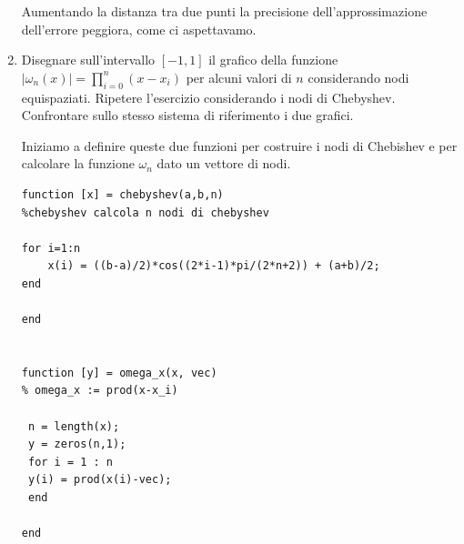 \begin{enumerate}
\begin{svol}
\begin{codice}
\begin{verbatim}
\end{verbatim}
\end{codice}
Aumentando la distanza tra due punti la precisione dell'approssimazione
dell'errore peggiora, come ci aspettavamo.
\end{svol}

\item
Disegnare sull'intervallo $[-1,1]$ il grafico della funzione $|\omega_n(x)|
= \prod_{i=0}^n(x-x_i)$ per alcuni valori di $n$ considerando nodi equispaziati.
Ripetere l'esercizio considerando i nodi di Chebyshev. Confrontare sullo
stesso sistema di riferimento i due grafici.

\begin{svol}
Iniziamo a definire queste due funzioni per costruire i nodi di Chebishev
e per calcolare la funzione $\omega_n$ dato un vettore di nodi.
\begin{codice}
\begin{verbatim}
function [x] = chebyshev(a,b,n)
%chebyshev calcola n nodi di chebyshev

for i=1:n
    x(i) = ((b-a)/2)*cos((2*i-1)*pi/(2*n+2)) + (a+b)/2; 
end

end


function [y] = omega_x(x, vec)
% omega_x := prod(x-x_i)

 n = length(x);
 y = zeros(n,1);
 for i = 1 : n
 y(i) = prod(x(i)-vec);
 end
 
end


\end{verbatim}
\end{codice}
\end{svol}
\end{enumerate}

